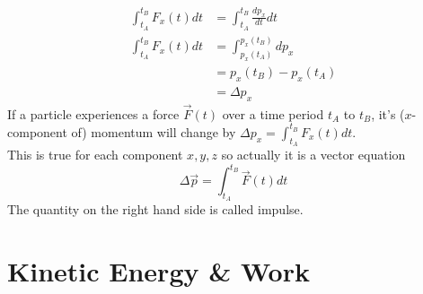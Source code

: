 \documentclass{article}
\begin{document}
\begin{align}
    \int_{t_A}^{t_B} F_x(t) dt &= \int_{t_A}^{t_B} \frac{dp_x}{dt} dt \\
    \int_{t_A}^{t_B} F_x(t) dt &= \int_{p_x(t_A)}^{p_x(t_B)} dp_x \\
    &= p_x(t_B) - p_x(t_A) \\
    &= \Delta p_x
\end{align}
If a particle experiences a force $\vec{F}(t)$ over a time period $t_A$ to $t_B$, it's ($x$-component of) momentum will change by $\Delta p_x = \int_{t_A}^{t_B} F_x(t) dt$.\\[10pt]
This is true for each component $x,y,z$ so actually it is a vector equation 
$$\Delta \vec{p} = \int_{t_A}^{t_B} \vec{F}(t) dt$$
The quantity on the right hand side is called impulse.


\section{Kinetic Energy \& Work}
\end{document}
